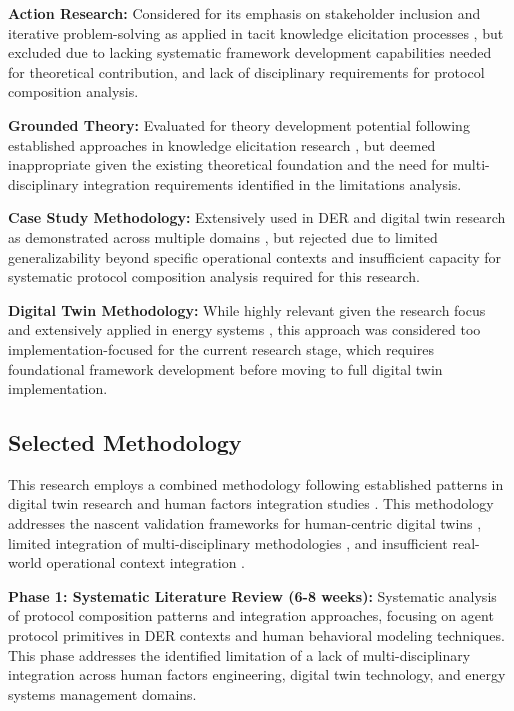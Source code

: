 \documentclass[12pt,a4paper]{article}
\begin{document}
\textbf{Action Research:} Considered for its emphasis on stakeholder inclusion and iterative problem-solving as applied in tacit knowledge elicitation processes \cite{10.1007/s44163-022-00020-w}, but excluded due to lacking systematic framework development capabilities needed for theoretical contribution, and lack of disciplinary requirements for protocol composition analysis.

\textbf{Grounded Theory:} Evaluated for theory development potential following established approaches in knowledge elicitation research \cite{10.1007/s44163-022-00020-w}, but deemed inappropriate given the existing theoretical foundation and the need for multi-disciplinary integration requirements identified in the limitations analysis.

\textbf{Case Study Methodology:} Extensively used in DER and digital twin research as demonstrated across multiple domains \cite{10.1016/j.apergo.2018.07.016} \cite{10.1109/ETFA61755.2024.10711109}, but rejected due to limited generalizability beyond specific operational contexts and insufficient capacity for systematic protocol composition analysis required for this research.

\textbf{Digital Twin Methodology:} While highly relevant given the research focus and extensively applied in energy systems \cite{10.1016/j.ifacol.2022.09.675} \cite{10.1186/s10033-024-00998-7}, this approach was considered too implementation-focused for the current research stage, which requires foundational framework development before moving to full digital twin implementation.

\subsection{Selected Methodology}

This research employs a combined methodology following established patterns in digital twin research \cite{10.1016/j.esr.2024.101334} and human factors integration studies \cite{10.1109/ETFA61755.2024.10711109}. This methodology addresses the nascent validation frameworks for human-centric digital twins \cite{10.1109/etfa61755.2024.10711109}, limited integration of multi-disciplinary methodologies \cite{10.1016/j.ifacol.2022.09.675}, and insufficient real-world operational context integration \cite{10.1007/s10207-023-00784-x}.

\textbf{Phase 1: Systematic Literature Review (6-8 weeks):} Systematic analysis of protocol composition patterns and integration approaches, focusing on agent protocol primitives in DER contexts and human behavioral modeling techniques. This phase addresses the identified limitation of a lack of multi-disciplinary integration across human factors engineering, digital twin technology, and energy systems management domains.
\end{document}
